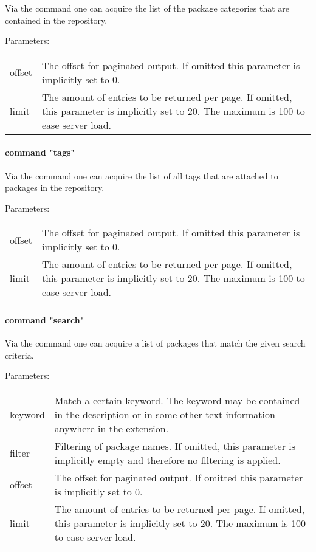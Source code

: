 Via the  command one can acquire the list of the package categories that are contained in the repository.

Parameters:\\
\begin{tabular}{lp{}}\\
offset & The offset for paginated output. If omitted this parameter is implicitly set to 0. \\ 
limit & The amount of entries to be returned per page. If omitted, this parameter is implicitly set to 20. The maximum is 100 to ease server load.
\end{tabular}

\paragraph{command "tags"}

Via the  command one can acquire the list of all tags that are attached to packages in the repository.

Parameters:\\
\begin{tabular}{lp{}}\\
offset & The offset for paginated output. If omitted this parameter is implicitly set to 0. \\ 
limit & The amount of entries to be returned per page. If omitted, this parameter is implicitly set to 20. The maximum is 100 to ease server load.
\end{tabular}

\paragraph{command "search"}

Via the  command one can acquire a list of packages that match the given search criteria.

Parameters:\\
\begin{tabular}{lp{}}\\
keyword & Match a certain keyword. The keyword may be contained in the description or in some other text information anywhere in the extension.\\
filter & Filtering of package names. If omitted, this parameter is implicitly empty and therefore no filtering is applied.\\ 
offset & The offset for paginated output. If omitted this parameter is implicitly set to 0. \\ 
limit & The amount of entries to be returned per page. If omitted, this parameter is implicitly set to 20. The maximum is 100 to ease server load.
\end{tabular}

